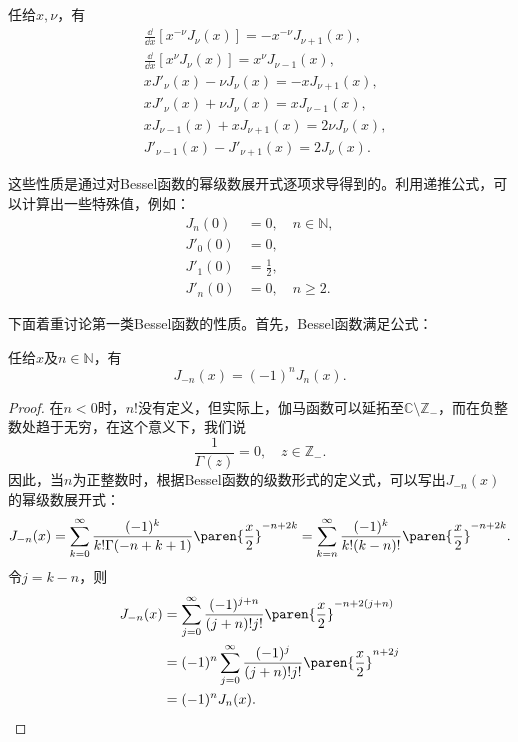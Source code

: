 \begin{claim}[递推公式]
    \label{claim:bessel_recursion}
    任给$x,\nu$，有
    \begin{align}
        &\frac{\dd}{\dd x}[x^{-\nu}J_{\nu}(x)]=-x^{-\nu}J_{\nu+1}(x),\\
        &\frac{\dd}{\dd x}[x^{\nu}J_{\nu}(x)]=x^{\nu}J_{\nu-1}(x),\\
        &xJ'_{\nu}(x)-\nu J_{\nu}(x)=-xJ_{\nu+1}(x),\\
        &xJ'_{\nu}(x)+\nu J_{\nu}(x)=xJ_{\nu-1}(x),\\
        &xJ_{\nu-1}(x)+xJ_{\nu+1}(x)=2\nu J_{\nu}(x),\\
        &J'_{\nu-1}(x)-J'_{\nu+1}(x)=2J_{\nu}(x).
    \end{align}
\end{claim}

这些性质是通过对Bessel函数的幂级数展开式逐项求导得到的。利用递推公式，可以计算出一些特殊值，例如：
\begin{align}
    J_n(0)&=0,\quad n\in\mathbb{N},\\
    J'_0(0)&=0,\\
    J'_1(0)&=\frac{1}{2},\\
    J'_n(0)&=0,\quad n\geq 2.
\end{align}

下面着重讨论第一类Bessel函数的性质。首先，Bessel函数满足公式：
\begin{proposition}
    任给$x$及$n\in\mathbb{N}$，有
    \begin{equation}
        J_{-n}(x)=(-1)^n J_n(x).
    \end{equation}
\end{proposition}
\begin{proof}
    在$n<0$时，$n!$没有定义，但实际上，伽马函数可以延拓至$\mathbb{C}\setminus \mathbb{Z}_-$，而在负整数处趋于无穷，在这个意义下，我们说
    \begin{equation}
        \frac{1}{\Gamma(z)}=0,\quad z\in \mathbb{Z}_-.
    \end{equation}
    因此，当$n$为正整数时，根据Bessel函数的级数形式的定义式，可以写出$J_{-n}(x)$的幂级数展开式：
    \begin{equation}
        J_{-n}(x)=\sum_{k=0}^{\infty}\frac{(-1)^k}{k!\Gamma(-n+k+1)}\paren{\frac{x}{2}}^{-n+2k}=\sum_{k=n}^{\infty}\frac{(-1)^k}{k!(k-n)!}\paren{\frac{x}{2}}^{-n+2k}.
    \end{equation}
    令$j=k-n$，则
    \begin{align}
        J_{-n}(x)&=\sum_{j=0}^{\infty}\frac{(-1)^{j+n}}{(j+n)!j!}\paren{\frac{x}{2}}^{-n+2(j+n)}\nonumber\\
                 &=(-1)^n\sum_{j=0}^{\infty}\frac{(-1)^j}{(j+n)!j!}\paren{\frac{x}{2}}^{n+2j}\nonumber\\
                 &=(-1)^n J_n(x).
    \end{align}
\end{proof}

